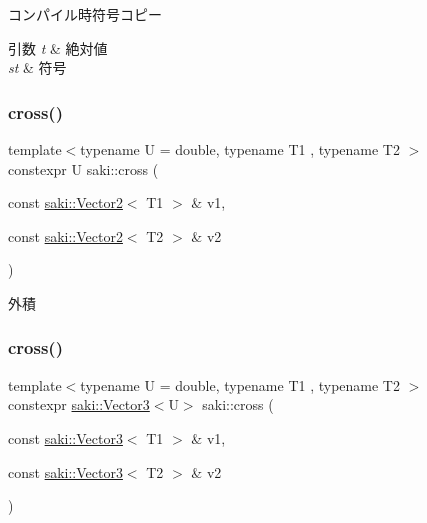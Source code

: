 コンパイル時符号コピー 


\begin{DoxyParams}{引数}
{\em t} & 絶対値 \\
\hline
{\em st} & 符号 \\
\hline
\end{DoxyParams}
\mbox{\label{namespacesaki_afafc06ccc85183ee8b08a2cbeded09c8}} 
\subsubsection{\texorpdfstring{cross()}{cross()}\hspace{0.1cm}{\footnotesize\ttfamily [1/2]}}
{\footnotesize\ttfamily template$<$typename U  = double, typename T1 , typename T2 $>$ \\
constexpr U saki\+::cross (\begin{DoxyParamCaption}\item[{const \mbox{\hyperlink{classsaki_1_1_vector2}{saki\+::\+Vector2}}$<$ T1 $>$ \&}]{v1,  }\item[{const \mbox{\hyperlink{classsaki_1_1_vector2}{saki\+::\+Vector2}}$<$ T2 $>$ \&}]{v2 }\end{DoxyParamCaption})}



外積 

\mbox{\label{namespacesaki_a5abe501bb1b1b0f15b56409f59a6b319}} 
\subsubsection{\texorpdfstring{cross()}{cross()}\hspace{0.1cm}{\footnotesize\ttfamily [2/2]}}
{\footnotesize\ttfamily template$<$typename U  = double, typename T1 , typename T2 $>$ \\
constexpr \mbox{\hyperlink{classsaki_1_1_vector3}{saki\+::\+Vector3}}$<$U$>$ saki\+::cross (\begin{DoxyParamCaption}\item[{const \mbox{\hyperlink{classsaki_1_1_vector3}{saki\+::\+Vector3}}$<$ T1 $>$ \&}]{v1,  }\item[{const \mbox{\hyperlink{classsaki_1_1_vector3}{saki\+::\+Vector3}}$<$ T2 $>$ \&}]{v2 }\end{DoxyParamCaption})}



